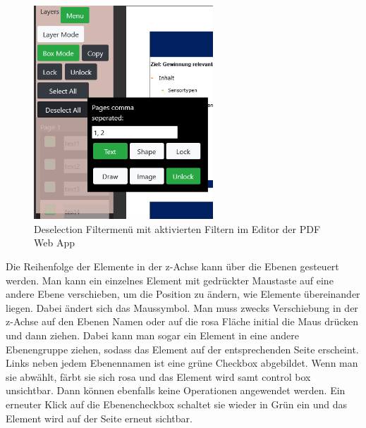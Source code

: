 \begin{figure}[!htbp]
	\centering
	\includegraphics[width=0.6\textwidth]{"images/filtering.png"}
	\caption{Deselection Filtermenü mit aktivierten Filtern im Editor der PDF Web App}
	\label{fig:filtering}
\end{figure}

Die Reihenfolge der Elemente in der z-Achse kann über die Ebenen gesteuert werden. Man kann ein einzelnes Element mit gedrückter Maustaste auf eine andere Ebene verschieben, um die Position zu ändern, wie Elemente übereinander liegen. Dabei ändert sich das Maussymbol. Man muss zwecks Verschiebung in der z-Achse auf den Ebenen Namen oder auf die rosa Fläche initial die Maus drücken und dann ziehen. Dabei kann man sogar ein Element in eine andere Ebenengruppe ziehen, sodass das Element auf der entsprechenden Seite erscheint. Links neben jedem Ebenennamen ist eine grüne Checkbox abgebildet. Wenn man sie abwählt, färbt sie sich rosa und das Element wird samt control box unsichtbar. Dann können ebenfalls keine Operationen angewendet werden. Ein erneuter Klick auf die Ebenencheckbox schaltet sie wieder in Grün ein und das Element wird auf der Seite erneut sichtbar. 


